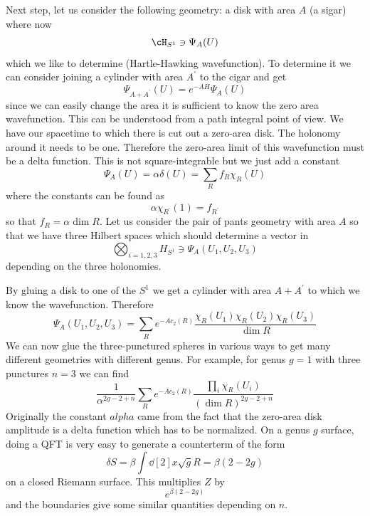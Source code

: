 \documentclass[11pt]{article}
\theoremstyle{definition}
\numberwithin{equation}{section}
\begin{document}
Next step, let us consider the following geometry: a disk with area $A$ (a sigar) where now
\begin{equation}
	\cH_{S^1}\ni \Psi_A(U)
\end{equation}
which we like to determine (Hartle-Hawking wavefunction). To determine it we can consider joining a cylinder with area $A^\prime$ to the cigar and get
\begin{equation}
	\Psi_{A+A^\prime}(U)=e^{-A H}\Psi_A(U)
\end{equation}
since we can easily change the area it is sufficient to know the zero area wavefunction. This can be understood from a path integral point of view. We have our spacetime to which there is cut out a zero-area disk. The holonomy around it needs to be one. Therefore the zero-area limit of this wavefunction must be a delta function. This is not square-integrable but we just add a constant
\begin{equation}
	\Psi_A(U)=\alpha\delta(U)=\sum_R f_R\chi_R(U)
\end{equation}
where the constants can be found as
\begin{equation}
	\alpha\chi_{R^\prime}(1)=f_{R^\prime}
\end{equation}
so that $f_R=\alpha \dim R$. Let us consider the pair of pants geometry with area $A$ so that we have three Hilbert spaces which should determine a vector in 
\begin{equation}
	\bigotimes_{i=1,2,3} H_{S^1}\ni \Psi_A(U_1,U_2,U_3)
\end{equation}
depending on the three holonomies.

By gluing a disk to one of the $S^1$ we get a cylinder with area $A+A^\prime$ to which we know the wavefunction. Therefore 
\begin{equation}
	\Psi_A(U_1,U_2,U_3)=\sum_R e^{-A c_2(R)}\frac{\chi_R(U_1)\chi_R(U_2)\chi_R(U_3)}{\dim R}
\end{equation}
We can now glue the three-punctured spheres in various ways to get many different geometries with different genus. For example, for genus $g=1$ with three punctures $n=3$ we can find 
\begin{equation}
	\frac{1}{\alpha^{2g-2+n}}\sum_R e^{-A c_2(R)}\frac{\prod_i \chi_R(U_i)}{(\dim R)^{2g-2+n}}
\end{equation}
Originally the constant $alpha$ came from the fact that the zero-area disk amplitude is a delta function which has to be normalized. On a genus $g$ surface, doing a QFT is very easy to generate a counterterm of the form 
\begin{equation}
	\delta S=\beta\int \dd[2]{x}\sqrt{g}R=\beta (2-2g)
\end{equation}
on a closed Riemann surface. This multiplies $Z$ by 
\begin{equation}
	e^{\beta(2-2g)}
\end{equation}
and the boundaries give some similar quantities depending on $n$. 
\end{document}
